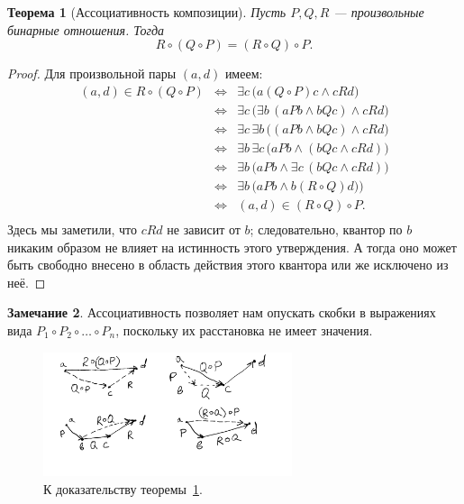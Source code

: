 \documentclass[12pt,notitlepage]{article}
\theoremstyle{plain}
\newtheorem{thm}{Теорема}[section]
\theoremstyle{definition}
\newtheorem{rem}[thm]{Замечание}
\theoremstyle{plain}
\newcommand{\1}{\mathbf{1}}
\newcommand{\0}{\mathbf{0}}
\newcommand{\mcomm}[1]{}
\begin{document}
\begin{thm}[Ассоциативность композиции]\label{ch0:rel_comp}
	Пусть $P, Q, R$ --- произвольные бинарные отношения. Тогда
	$$R \circ (Q \circ P) = (R \circ Q) \circ P.$$
\end{thm}
\begin{proof} Для произвольной пары $(a,d)$ имеем:
	$$
	\begin{array}{rcl}
		(a, d) \in R \circ (Q \circ P) &\iff& \exists c\, \bigl( a(Q \circ P)c \wedge cRd \bigr)\\
		&\iff&\exists c\, \bigl( \exists b\, ( aPb \wedge bQc ) \wedge cRd \bigr)\\
		&\iff& \exists c\, \exists b\, \bigl(  (aPb \wedge bQc)  \wedge cRd \bigr)\\
		&\iff& \exists b\, \exists c\, \bigl(  aPb \wedge (bQc  \wedge cRd) \bigr)\\
		&\iff&\exists b\, \bigl( aPb \wedge \exists c\, (bQc  \wedge cRd ) \bigr)\\
		&\iff&\exists b\, \bigl( aPb \wedge b(R \circ Q)d ) \bigr)\\
		&\iff& (a,d) \in (R \circ Q)\circ P.\\
	\end{array}
	$$
	Здесь мы заметили, что $c R d$ не зависит от $b$; следовательно, квантор по $b$ никаким образом не влияет на истинность этого утверждения. А тогда оно может быть свободно внесено в область действия этого квантора или же исключено из неё.
	
\end{proof}
\mcomm{For this argument, the Instructor might wish to explain the logical equivalences $\exists x\, (A(x) \wedge B) \equiv \exists x\, A(x) \wedge B$ (where $B$ does not mention $x$) and $\exists x \exists y\, A \equiv \exists y \exists x\, A$ in more detail.}
\begin{rem}
	Ассоциативность позволяет нам опускать скобки в выражениях вида $P_1 \circ P_2 \circ \ldots \circ P_n$, поскольку их расстановка не имеет значения.
\end{rem}

\begin{figure}[h]
	\centering
	\includegraphics*[width=0.65\textwidth]{comp_assoc.pdf}
	\caption{К доказательству теоремы~\ref{ch0:rel_comp}.}
\end{figure}
\end{document}
